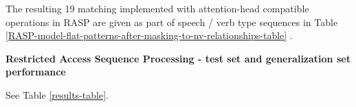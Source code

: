 \documentclass[11pt]{article}
\begin{document}
The resulting 19 matching implemented with attention-head compatible operations in RASP are given as part of speech / verb type sequences in Table \ref{RASP-model-flat-patterns-after-masking-to-nv-relationships-table} .


\textbf{ Restricted Access Sequence Processing - test set and generalization set performance}






See Table \ref{results-table}.
\end{document}
